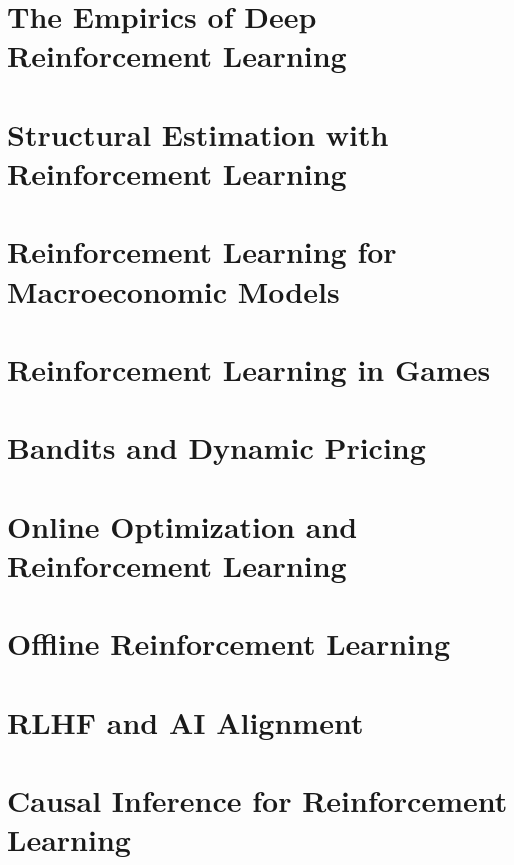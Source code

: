 \documentclass[11pt,notitlepage,a4paper]{article}
\begin{document}
\section{The Empirics of Deep Reinforcement Learning}
\label{section:deeprl_practice}


\section{Structural Estimation with Reinforcement Learning}
\label{section:rl_econ_models}


\section{Reinforcement Learning for Macroeconomic Models}
\label{section:rl_macro}


\section{Reinforcement Learning in Games}
\label{section:rl_games}


\section{Bandits and Dynamic Pricing}
\label{section:bandits}


\section{Online Optimization and Reinforcement Learning}
\label{section:online_optimization_rl}


\section{Offline Reinforcement Learning}
\label{section:offline_rl}


\section{RLHF and AI Alignment}
\label{section:rlhf}


\section{Causal Inference for Reinforcement Learning}
\label{section:causal_rl}

\end{document}
